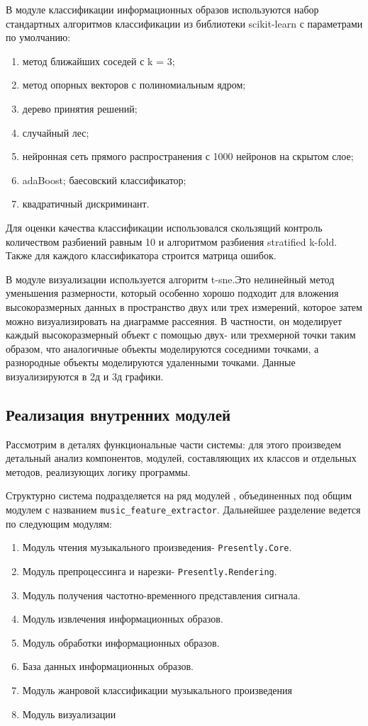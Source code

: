 В модуле классификации информационных образов используются набор стандартных алгоритмов классификации из библиотеки scikit-learn с параметрами по умолчанию:
\begin{enumerate}
\item метод ближайших соседей с k = 3;
\item метод опорных векторов с полиномиальным ядром;
\item дерево принятия решений;
\item случайный лес;
\item нейронная сеть прямого распространения с 1000 нейронов на скрытом слое;
\item adaBoost;
 баесовский классификатор;
\item квадратичный дискриминант.
\end{enumerate}

Для оценки качества классификации использовался скользящий контроль количеством разбиений равным 10 и алгоритмом разбиения stratified k-fold. Также для каждого классификатора строится матрица ошибок.

В модуле визуализации используется алгоритм t-sne.Это нелинейный метод уменьшения размерности, который особенно хорошо подходит для вложения высокоразмерных данных в пространство двух или трех измерений, которое затем можно визуализировать на диаграмме рассеяния. В частности, он моделирует каждый высокоразмерный объект с помощью двух- или трехмерной точки таким образом, что аналогичные объекты моделируются соседними точками, а разнородные объекты моделируются удаленными точками. Данные визуализируются в 2д и 3д графики. 


\subsection{Реализация внутренних модулей}
Рассмотрим в деталях функциональные части системы: для этого произведем детальный анализ компонентов, модулей, составляющих их классов и отдельных методов, реализующих логику программы.



Структурно система подразделяется на ряд модулей , объединенных под общим модулем с названием \texttt{music\_feature\_extractor}. Дальнейшее разделение ведется по следующим модулям:
\begin{enumerate}[label=\arabic*.]
\item{Модуль чтения музыкального произведения- \texttt{Presently.Core}.}
\item{Модуль препроцессинга и нарезки- \texttt{Presently.Rendering}.}
\item{Модуль получения частотно-временного представления сигнала.}
\item{Модуль извлечения информационных образов.}
\item{Модуль обработки информационных образов. }
\item{База данных информационных образов.}
\item{Модуль жанровой классификации музыкального произведения}
\item{Модуль визуализации}
\end{enumerate}

